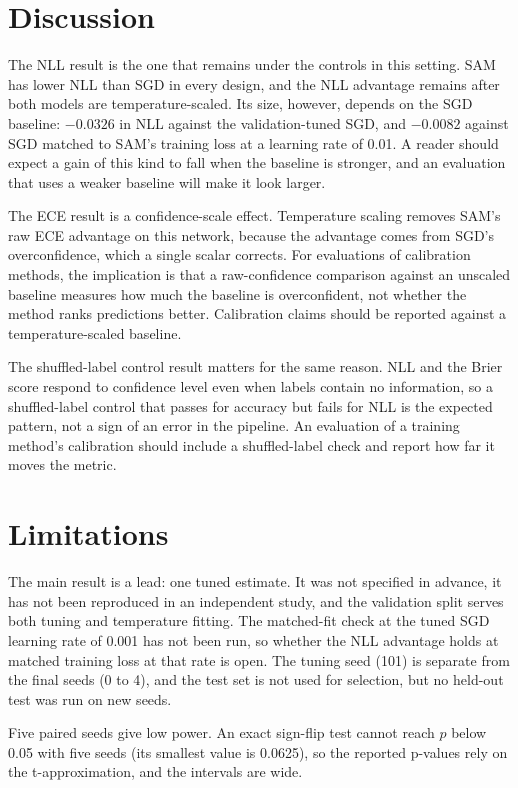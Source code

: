 \documentclass[11pt,letterpaper]{article}
\begin{document}
\section{Discussion}\label{sec:discussion}
The NLL result is the one that remains under the controls in this setting. SAM has lower NLL than SGD in every design, and the NLL advantage remains after both models are temperature-scaled. Its size, however, depends on the SGD baseline: $-0.0326$ in NLL against the validation-tuned SGD, and $-0.0082$ against SGD matched to SAM's training loss at a learning rate of 0.01. A reader should expect a gain of this kind to fall when the baseline is stronger, and an evaluation that uses a weaker baseline will make it look larger.

The ECE result is a confidence-scale effect. Temperature scaling removes SAM's raw ECE advantage on this network, because the advantage comes from SGD's overconfidence, which a single scalar corrects. For evaluations of calibration methods, the implication is that a raw-confidence comparison against an unscaled baseline measures how much the baseline is overconfident, not whether the method ranks predictions better. Calibration claims should be reported against a temperature-scaled baseline.

The shuffled-label control result matters for the same reason. NLL and the Brier score respond to confidence level even when labels contain no information, so a shuffled-label control that passes for accuracy but fails for NLL is the expected pattern, not a sign of an error in the pipeline. An evaluation of a training method's calibration should include a shuffled-label check and report how far it moves the metric.

\section{Limitations}\label{sec:limitations}
The main result is a lead: one tuned estimate. It was not specified in advance, it has not been reproduced in an independent study, and the validation split serves both tuning and temperature fitting. The matched-fit check at the tuned SGD learning rate of 0.001 has not been run, so whether the NLL advantage holds at matched training loss at that rate is open. The tuning seed (101) is separate from the final seeds (0 to 4), and the test set is not used for selection, but no held-out test was run on new seeds.

Five paired seeds give low power. An exact sign-flip test cannot reach $p$ below 0.05 with five seeds (its smallest value is 0.0625), so the reported p-values rely on the t-approximation, and the intervals are wide.
\end{document}
